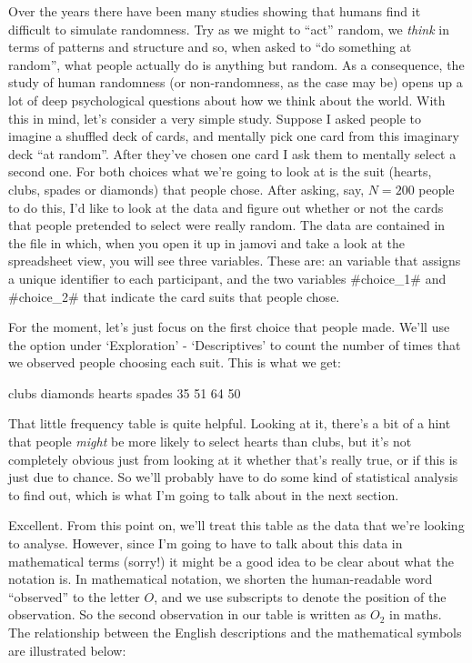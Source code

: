 
Over the years there have been many studies showing that humans find it difficult to simulate randomness. Try as we might to ``act'' random, we {\it think} in terms of patterns and structure and so, when asked to ``do something at random'', what people actually do is anything but random. As a consequence, the study of human randomness (or non-randomness, as the case may be) opens up a lot of deep psychological questions about how we think about the world. With this in mind, let's consider a very simple study. Suppose I asked people to imagine a shuffled deck of cards, and mentally pick one card from this imaginary deck ``at random''. After they've chosen one card I ask them to mentally select a second one. For both choices what we're going to look at is the suit (hearts, clubs, spades or diamonds) that people chose. After asking, say, $N=200$ people to do this, I'd like to look at the data and figure out whether or not the cards that people pretended to select were really random. The data are contained in the  file in which, when you open it up in jamovi and take a look at the spreadsheet view, you will see three variables. These are: an  variable that assigns a unique identifier to each participant, and the two variables \rtextverb#choice_1# and \rtextverb#choice_2# that indicate the card suits that people chose. 

For the moment, let's just focus on the first choice that people made. We'll use the  option under `Exploration' - `Descriptives' to count the number of times that we observed people choosing each suit. This is what we get: 

\begin{rblock1}
   clubs diamonds   hearts   spades 
      35       51       64       50      
\end{rblock1}

That little frequency table is quite helpful. Looking at it, there's a bit of a hint that people {\it might} be more likely to select hearts than clubs, but it's not completely obvious just from looking at it whether that's really true, or if this is just due to chance. So we'll probably have to do some kind of statistical analysis to find out, which is what I'm going to talk about in the next section. 

Excellent. From this point on, we'll treat this table as the data that we're looking to analyse. However, since I'm going to have to talk about this data in mathematical terms (sorry!) it might be a good idea to be clear about what the notation is. In mathematical notation, we shorten the human-readable word “observed” to the letter $O$, and we use subscripts to denote the position of the observation. So the second observation in our table is written as $O_2$ in maths. The relationship between the English descriptions and the mathematical symbols are illustrated below: 

